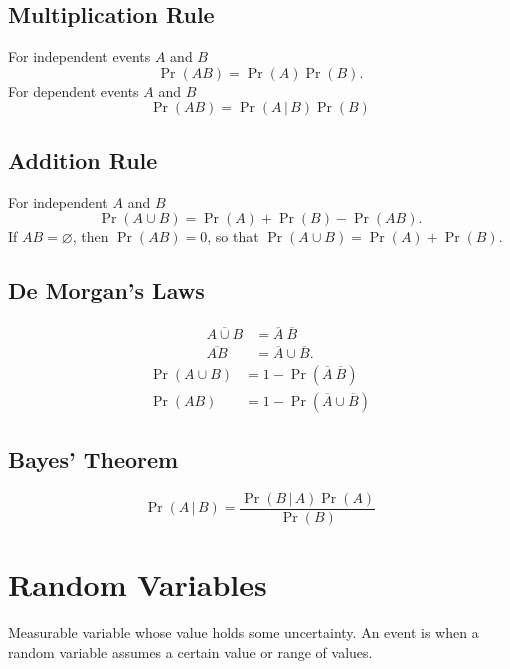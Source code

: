 \documentclass{article}
\begin{document}
\begin{multicols}{3}
    \subsection{Multiplication Rule}
    For independent events \(A\) and \(B\)
    \begin{equation*}
        \Pr{\left( AB \right)} = \Pr{\left( A \right)} \Pr{\left( B \right)}.
    \end{equation*}
    For dependent events \(A\) and \(B\)
    \begin{equation*}
        \Pr{\left( AB \right)} = \Pr{\left( A \,\vert \, B \right)} \Pr{\left( B \right)}
    \end{equation*}
    \subsection{Addition Rule}
    For independent \(A\) and \(B\)
    \begin{equation*}
        \Pr{\left( A \cup B \right)} = \Pr{\left( A \right)} + \Pr{\left( B \right)} - \Pr{\left( AB \right)}.
    \end{equation*}
    If \(AB = \varnothing \), then \(\Pr{\left( AB \right)} = 0\), so that \(\Pr{\left( A \cup B \right)} = \Pr{\left( A \right)} + \Pr{\left( B \right)}\).
    \subsection{De Morgan's Laws}
    \begin{align*}
        \overline{A \cup B} & = \overline{A} \ \overline{B}     \\
        \overline{AB}       & = \overline{A} \cup \overline{B}.
    \end{align*}
    \begin{align*}
        \Pr{\left( A \cup B \right)} & = 1 - \Pr{\left( \overline{A} \ \overline{B} \right)}    \\
        \Pr{\left( AB \right)}       & = 1 - \Pr{\left( \overline{A} \cup \overline{B} \right)}
    \end{align*} 
    \subsection{Bayes' Theorem}
    \begin{equation*}
        \Pr{\left( A \,\vert\, B \right)} = \frac{\Pr{\left( B \,\vert\, A \right)}\Pr{\left( A \right)}}{\Pr{\left( B \right)}}
    \end{equation*}
    \section{Random Variables}
        Measurable variable whose value holds some uncertainty.
        An event is when a random variable assumes a certain value or range of values.

\end{multicols}
\end{document}
